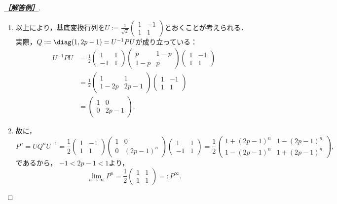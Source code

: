 \documentclass[uplatex,dvipdfmx]{jsarticle}
\begin{document}
\begin{proof}[\textbf{\underline{［解答例］}}]
\begin{enumerate}
\begin{enumerate}
\begin{enumerate}
            \end{enumerate}
            \item 以上により，基底変換行列を$U:=\frac{1}{\sqrt{2}}\begin{pmatrix}1&-1\\1&1\end{pmatrix}$とおくことが考えられる．
            実際，$Q:=\diag(1,2p-1)=U^{-1}PU$が成り立っている：
            \begin{align*}
                U^{-1}PU&=\frac{1}{2}\begin{pmatrix}1&1\\-1&1\end{pmatrix}\begin{pmatrix}p&1-p\\1-p&p\end{pmatrix}\begin{pmatrix}1&-1\\1&1\end{pmatrix}\\
                &=\frac{1}{2}\begin{pmatrix}1&1\\1-2p&2p-1\end{pmatrix}\begin{pmatrix}1&-1\\1&1\end{pmatrix}\\
                &=\begin{pmatrix}1&0\\0&2p-1\end{pmatrix}.
            \end{align*}
            \item 故に，
            \[P^n=UQ^nU^{-1}=\frac{1}{2}\begin{pmatrix}1&-1\\1&1\end{pmatrix} \begin{pmatrix}1&0\\0&(2p-1)^n\end{pmatrix}\begin{pmatrix}1&1\\-1&1\end{pmatrix}=\frac{1}{2}\begin{pmatrix}1+(2p-1)^n&1-(2p-1)^n\\1-(2p-1)^n&1+(2p-1)^n\end{pmatrix},\]
            であるから，
            $-1<2p-1<1$より，
            \[\lim_{n\to\infty}P^n=\frac{1}{2}\begin{pmatrix}1&1\\1&1\end{pmatrix}=:P^\infty.\]

\end{enumerate}
\end{enumerate}
\end{proof}
\end{document}
